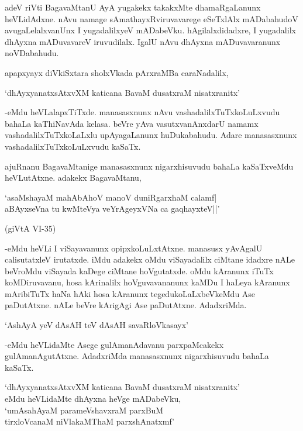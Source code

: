 adeV riVti BagavaMtanU AyA yugakekx takakxMte dhamaRgaLanunx heVLidAdxne. nAvu namage sAmathayxRviruvavarege eSeTxlAlx mADabahudoV avugaLelalxvanUnx I yugadalilxyeV mADabeVku. hAgilalxdidadxre, I yugadalilx dhAyxna mADuvavareV iruvudilalx. IgalU nAvu dhAyxna mADuvavaranunx noVDabahudu.

apapxyayx diVkiSxtara sholxVkada pArxraMBa caraNadalilx,

\begin{shloka}
`dhAyxyanatxsAtxvXM katicana BavaM dusatxraM nisatxranitx'
\end{shloka}

-eMdu heVLalapxTiTxde. manasasxnunx nAvu vashadalilxTuTxkoLuLxvudu bahaLa kaThiNavAda kelasa. beVre yAva vasutxvanAnxdarU namamx vashadalilxTuTxkoLaLxlu upAyagaLanunx huDukabahudu. Adare manasasxnunx vashadalilxTuTxkoLuLxvudu kaSaTx.

ajuRnanu BagavaMtanige manasasxnunx nigarxhisuvudu bahaLa kaSaTxveMdu heVLutAtxne. adakekx BagavaMtanu,

\begin{shloka}
`asaMshayaM mahAbAhoV manoV duniRgarxhaM calamf|\\
aBAyxseVna tu kwMteVya veYrAgeyxVNa ca gaqhayxteV||'\\
\begin{flushright}
(giVtA {\eng VI-35})
\end{flushright}
\end{shloka}

-eMdu heVLi I viSayavanunx opipxkoLuLxtAtxne. manasusx yAvAgalU calisutatxleV irutatxde. iMdu adakekx oMdu viSayadalilx ciMtane idadxre nALe beVroMdu viSayada kaDege ciMtane hoVgutatxde. oMdu kAranunx iTuTx koMDiruvavanu, hosa kArinalilx hoVguvavananunx kaMDu I haLeya kAranunx mAribiTuTx haNa hAki hosa kAranunx tegedukoLaLxbeVkeMdu Ase paDutAtxne. nALe beVre kArigAgi Ase paDutAtxne. AdadxriMda.

\begin{shloka}
`AshAyA yeV dAsAH teV dAsAH savaRloVkasayx'
\end{shloka}

-eMdu heVLidaMte Asege gulAmanAdavanu parxpaMcakekx gulAmanAgutAtxne. AdadxriMda manasasxnunx nigarxhisuvudu bahaLa kaSaTx.

\begin{shloka}
`dhAyxyanatxsAtxvXM katicana BavaM dusatxraM nisatxranitx'\\
eMdu heVLidaMte dhAyxna heVge mADabeVku,\\
`umAsahAyaM parameVshavxraM parxBuM\\
tirxloVcanaM niVlakaMThaM parxshAnatxmf'
\end{shloka}


